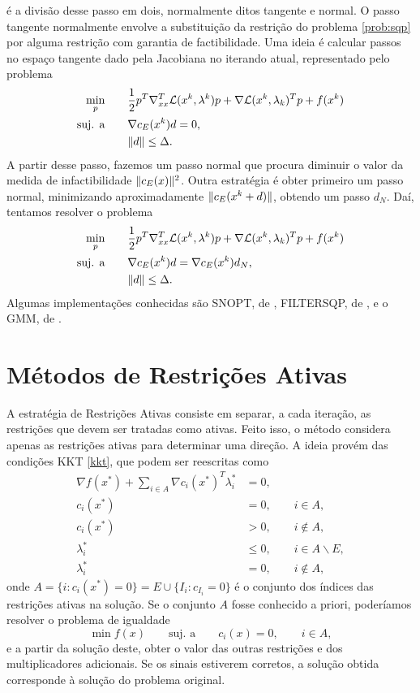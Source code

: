 é a divisão desse passo em dois, normalmente ditos tangente e normal.
O passo tangente normalmente envolve a substituição da restrição do problema
\eqref{prob:sqp} por alguma restrição com garantia de factibilidade.
Uma ideia é calcular passos no espaço tangente dado pela Jacobiana no iterando
atual, representado pelo problema
\begin{align*}
  \min_p \qquad & \frac{1}{2} p^T\nabla_{xx}^T\mathcal{L}(x^k,\lambda^k) p + 
    \nabla \mathcal{L}(x^k,\lambda_k)^Tp + f(x^k) \\
  \mbox{suj. a} \qquad & \nabla c_E(x^k)d = 0, \\
                    & \Vert d\Vert \leq \Delta.
\end{align*}
A partir desse passo, fazemos um passo normal que procura diminuir o valor da 
medida de infactibilidade $\Vert c_E(x)\Vert^2$. 
Outra estratégia é obter primeiro um passo normal, minimizando aproximadamente 
$\Vert c_E(x^k+d)\Vert$, obtendo um passo $d_N$. Daí, tentamos resolver o problema
\begin{align*}
  \min_p \qquad & \frac{1}{2} p^T\nabla_{xx}^T\mathcal{L}(x^k,\lambda^k) p + 
    \nabla \mathcal{L}(x^k,\lambda_k)^Tp + f(x^k) \\
  \mbox{suj. a} \qquad & \nabla c_E(x^k)d = \nabla c_E(x^k)d_N, \\
                    & \Vert d\Vert \leq \Delta.
\end{align*}
Algumas implementações conhecidas são SNOPT, de \citet{bib:snopt}, FILTERSQP,
de \citet{bib:filtersqp}, e o GMM, de
\citet{bib:chico-nonlinear-programming, bib:chico-gmm99}.

\section{Métodos de Restrições Ativas}

A estratégia de Restrições Ativas consiste em separar, a cada iteração, as
restrições que devem ser tratadas como ativas.
Feito isso, o método considera apenas as restrições ativas para
determinar uma direção. 
A ideia provém das condições KKT \eqref{kkt}, que podem ser reescritas como
\begin{align}
  \nabla f(x^*) + \sum_{i\in A}\nabla c_i(x^*)^T\lambda_i^* & = 0, \\
  c_i(x^*) & = 0, \qquad i \in A, \\
  c_i(x^*) & > 0, \qquad i \not\in A, \\
  \lambda_i^* & \leq 0, \qquad i \in A\backslash E, \\
  \lambda_i^* & = 0, \qquad i \not\in A,
\end{align}
onde $A = \{i : c_i(x^*) = 0\} = E\cup\{I_i: c_{I_i} = 0\}$ é o conjunto dos
índices das restrições ativas na solução. Se o conjunto $A$ fosse conhecido a
priori, poderíamos resolver o problema de igualdade
$$ \min f(x) \qquad \mbox{suj. a} \qquad c_i(x) = 0, \qquad i\in A,$$
e a partir da solução deste, obter o valor das outras restrições e dos
multiplicadores adicionais. Se os sinais estiverem corretos, a solução obtida
corresponde à solução do problema original.

